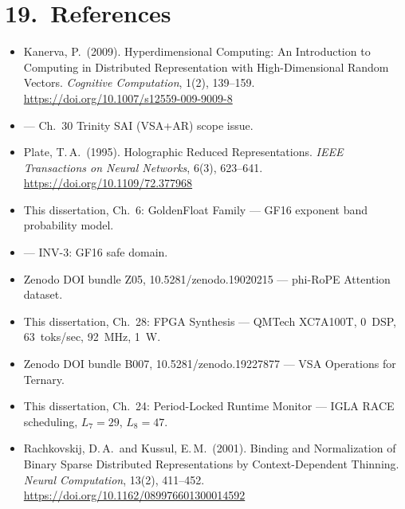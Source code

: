 \section{19.\ References}\label{sec:ch30-references}

\begin{itemize}

\item[\lbrack1\rbrack] Kanerva, P.\ (2009).
  Hyperdimensional Computing: An Introduction to
  Computing in Distributed Representation with
  High-Dimensional Random Vectors.
  \emph{Cognitive Computation}, 1(2), 139--159.
  \url{https://doi.org/10.1007/s12559-009-9009-8}

\item[\lbrack2\rbrack]  ---
  Ch.~30 Trinity SAI (VSA+AR) scope issue.

\item[\lbrack3\rbrack] Plate, T.\,A.\ (1995).
  Holographic Reduced Representations.
  \emph{IEEE Transactions on Neural Networks},
  6(3), 623--641.
  \url{https://doi.org/10.1109/72.377968}

\item[\lbrack4\rbrack] This dissertation, Ch.~6:
  GoldenFloat Family --- GF16 exponent band
  probability model.

\item[\lbrack5\rbrack] 
  --- INV-3: GF16 safe domain.

\item[\lbrack6\rbrack] Zenodo DOI bundle Z05,
  10.5281/zenodo.19020215 --- phi-RoPE Attention
  dataset.

\item[\lbrack7\rbrack] This dissertation, Ch.~28:
  FPGA Synthesis --- QMTech XC7A100T, 0~DSP,
  63~toks/sec, 92~MHz, 1~W.

\item[\lbrack8\rbrack] Zenodo DOI bundle B007,
  10.5281/zenodo.19227877 --- VSA Operations for
  Ternary.

\item[\lbrack9\rbrack] This dissertation, Ch.~24:
  Period-Locked Runtime Monitor --- IGLA RACE
  scheduling, $L_7=29$, $L_8=47$.

\item[\lbrack10\rbrack] Rachkovskij, D.\,A.\ and
  Kussul, E.\,M.\ (2001). Binding and
  Normalization of Binary Sparse Distributed
  Representations by Context-Dependent Thinning.
  \emph{Neural Computation}, 13(2), 411--452.
  \url{https://doi.org/10.1162/089976601300014592}


\end{itemize}
